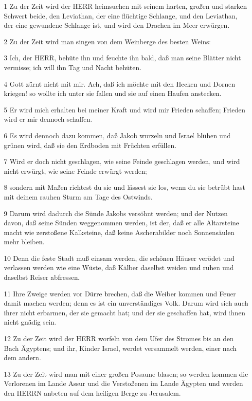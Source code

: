 \par 1 Zu der Zeit wird der HERR heimsuchen mit seinem harten, großen und starken Schwert beide, den Leviathan, der eine flüchtige Schlange, und den Leviathan, der eine gewundene Schlange ist, und wird den Drachen im Meer erwürgen.
\par 2 Zu der Zeit wird man singen von dem Weinberge des besten Weins:
\par 3 Ich, der HERR, behüte ihn und feuchte ihn bald, daß man seine Blätter nicht vermisse; ich will ihn Tag und Nacht behüten.
\par 4 Gott zürnt nicht mit mir. Ach, daß ich möchte mit den Hecken und Dornen kriegen! so wollte ich unter sie fallen und sie auf einen Haufen anstecken.
\par 5 Er wird mich erhalten bei meiner Kraft und wird mir Frieden schaffen; Frieden wird er mir dennoch schaffen.
\par 6 Es wird dennoch dazu kommen, daß Jakob wurzeln und Israel blühen und grünen wird, daß sie den Erdboden mit Früchten erfüllen.
\par 7 Wird er doch nicht geschlagen, wie seine Feinde geschlagen werden, und wird nicht erwürgt, wie seine Feinde erwürgt werden;
\par 8 sondern mit Maßen richtest du sie und lässest sie los, wenn du sie betrübt hast mit deinem rauhen Sturm am Tage des Ostwinds.
\par 9 Darum wird dadurch die Sünde Jakobs versöhnt werden; und der Nutzen davon, daß seine Sünden weggenommen werden, ist der, daß er alle Altarsteine macht wie zerstoßene Kalksteine, daß keine Ascherabilder noch Sonnensäulen mehr bleiben.
\par 10 Denn die feste Stadt muß einsam werden, die schönen Häuser verödet und verlassen werden wie eine Wüste, daß Kälber daselbst weiden und ruhen und daselbst Reiser abfressen.
\par 11 Ihre Zweige werden vor Dürre brechen, daß die Weiber kommen und Feuer damit machen werden; denn es ist ein unverständiges Volk. Darum wird sich auch ihrer nicht erbarmen, der sie gemacht hat; und der sie geschaffen hat, wird ihnen nicht gnädig sein.
\par 12 Zu der Zeit wird der HERR worfeln von dem Ufer des Stromes bis an den Bach Ägyptens; und ihr, Kinder Israel, werdet versammelt werden, einer nach dem andern.
\par 13 Zu der Zeit wird man mit einer großen Posaune blasen; so werden kommen die Verlorenen im Lande Assur und die Verstoßenen im Lande Ägypten und werden den HERRN anbeten auf dem heiligen Berge zu Jerusalem.

